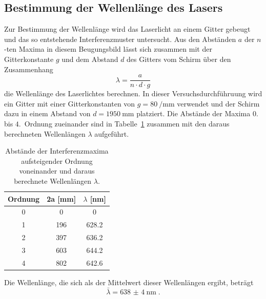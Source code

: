 \subsection{Bestimmung der Wellenlänge des Lasers}
%
Zur Bestimmung der Wellenlänge wird das Laserlicht an einem Gitter gebeugt und das so entstehende Interferenzmuster untersucht.
Aus den Abständen $a$ der $n$-ten Maxima in diesem Beugungsbild lässt sich zusammen mit der Gitterkonstante $g$ und dem Abstand $d$ des
Gitters vom Schirm über den Zusammenhang
%
\begin{equation}
  \lambda=\frac{a}{n\cdot d\cdot g}
\end{equation}
%
die Wellenlänge des Laserlichtes berechnen. In dieser Versuchsdurchführuung wird ein Gitter mit einer Gitterkonstanten von
$g=\SI{80}{\per\milli\meter}$ verwendet und der Schirm dazu in einem Abstand von $d=\SI{1950}{\milli\meter}$ platziert. Die Abstände
der Maxima $0.$ bis $4.$~Ordnung zueinander sind in Tabelle~\ref{tab:wellenlaenge} zusammen mit den daraus berechneten Wellenlängen
$\lambda$ aufgeführt.
%
\begin{table}
  \centering
  \caption{Abstände der Interferenzmaxima aufsteigender Ordnung voneinander und daraus berechnete Wellenlängen $\lambda$.}
  \begin{tabular}{ccc}
    \toprule
    {Ordnung}  & {2a [mm]} & {$\lambda$ [nm]} \\
		\midrule
	  \SI{0 }{} & \SI{  0}{} & \SI{  0}{} \\
    \SI{1 }{} & \SI{196}{} & \SI{628.2}{} \\
		\SI{2 }{} & \SI{397}{} & \SI{636.2}{} \\
		\SI{3 }{} & \SI{603}{} & \SI{644.2}{} \\
		\SI{4 }{} & \SI{802}{} & \SI{642.6}{} \\
    \bottomrule
	\end{tabular}
  \label{tab:wellenlaenge}
\end{table}
%
Die Wellenlänge, die sich als der Mittelwert dieser Wellenlängen ergibt, beträgt
%
\begin{equation}
  \bar{\lambda}=\SI{638(4)}{\nano\meter} \; .
\end{equation}
